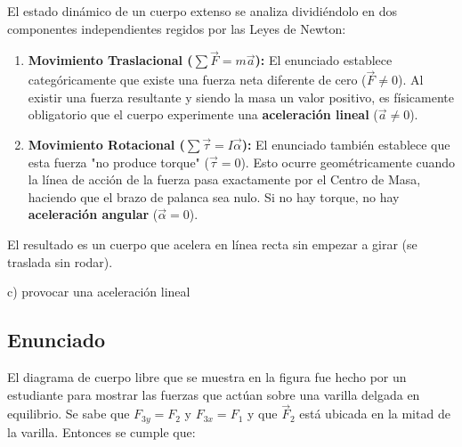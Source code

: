 \documentclass[12pt, a4paper]{article}
\begin{document}
El estado dinámico de un cuerpo extenso se analiza dividiéndolo en dos componentes independientes regidos por las Leyes de Newton:
\begin{enumerate}
    \item \textbf{Movimiento Traslacional ($\sum \vec{F} = m\vec{a}$):} El enunciado establece categóricamente que existe una fuerza neta diferente de cero ($\vec{F} \neq 0$). Al existir una fuerza resultante y siendo la masa un valor positivo, es físicamente obligatorio que el cuerpo experimente una \textbf{aceleración lineal} ($\vec{a} \neq 0$).
    \item \textbf{Movimiento Rotacional ($\sum \vec{\tau} = I\vec{\alpha}$):} El enunciado también establece que esta fuerza "no produce torque" ($\vec{\tau} = 0$). Esto ocurre geométricamente cuando la línea de acción de la fuerza pasa exactamente por el Centro de Masa, haciendo que el brazo de palanca sea nulo. Si no hay torque, no hay \textbf{aceleración angular} ($\vec{\alpha} = 0$).
\end{enumerate}

El resultado es un cuerpo que acelera en línea recta sin empezar a girar (se traslada sin rodar).

\begin{tcolorbox}[colback=green!5!white, colframe=green!50!black, title=Respuesta Final]
\centering \Large c) provocar una aceleración lineal
\end{tcolorbox}

\newpage

\subsection*{Enunciado}
El diagrama de cuerpo libre que se muestra en la figura fue hecho por un estudiante para mostrar las fuerzas que actúan sobre una varilla delgada en equilibrio. Se sabe que $F_{3y} = F_2$ y $F_{3x} = F_1$ y que $\vec{F}_2$ está ubicada en la mitad de la varilla. Entonces se cumple que:

\begin{center}
\end{center}
\end{document}
